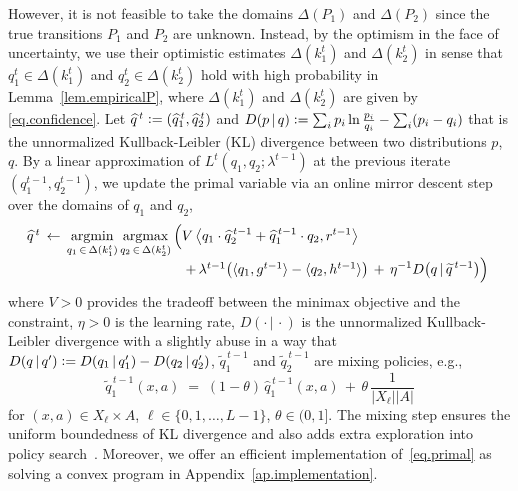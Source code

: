\documentclass[12pt, final]{l4dc2023}
\begin{document}
However, it is not feasible to take the domains $\Delta(P_1)$ and $\Delta(P_2)$ since the true transitions $P_1$ and $P_2$ are unknown. Instead, by the optimism in the face of uncertainty, we use their optimistic estimates $\Delta(k_1^t)$ and $\Delta(k_2^t)$ in sense that $q_1^t\in \Delta(k_1^t)$ and $q_2^t\in \Delta(k_2^t)$ hold with high probability in Lemma~\ref{lem.empiricalP}, where $\Delta(k_1^t)$ and $\Delta(k_2^t)$ are given by \eqref{eq.confidence}. Let $\widehat q^{\,t} \mathrel{\mathop:}= (\widehat q_1^{\,t},\widehat q_2^{\,t})$ and $D(p\,\vert\,q) \mathrel{\mathop:}= \sum_{i} p_i \ln\frac{p_i}{q_i} - \sum_{i} (p_i-q_i)$ that is the unnormalized Kullback-Leibler (KL) divergence between two distributions $p$, $q$.
By a linear approximation of $L^t(q_1,q_2;\lambda^{t-1})$ at the previous iterate $(q_1^{t-1},q_2^{t-1})$, we update the primal variable via an online mirror descent step over the domains of $q_1$ and $q_2$,
\begin{equation}\label{eq.primal}
\begin{array}{rcl}
&&  \!\!\!\! \!\!\!\! \!\!\!\! \!\!
\hat q^{\,t}
\,\leftarrow\,
\displaystyle \argmin_{q_1\,\in\,\Delta(k_1^t)} \argmax_{q_2\,\in\,\Delta(k_2^t)} 
\Big(
V\, 
\big\langle{q_1\cdot \hat q_2^{\,t-1}+\hat q_1^{\,t-1}\cdot q_2},{r^{t-1}}\big\rangle 
\\[0.2cm]
&& \;\;\;\;  \;\;\;\;  \;\;\;\;  \;\;\;\;  \;\;\;\;  \;\;\;\;  \;\;\;\;  \;\;\;\;
\,+\,
\lambda^{t-1} \big( \langle{q_1},{g^{t-1}}\rangle 
- \langle{q_2},{h^{t-1}}\rangle\big)
\, +\, 
\displaystyle \eta^{-1} D\big(q\,\vert\,  \tilde{q}^{\,t-1}\big)\Big)
\end{array}
\end{equation}
where $V>0$ provides the tradeoff between the minimax objective and the constraint, $\eta>0$ is the learning rate, $D(\cdot\,\vert\,\cdot)$ is the unnormalized Kullback-Leibler divergence with a slightly abuse in a way that $D(q\,\vert\,q') \mathrel{\mathop:}= D(q_1\,\vert\,q_1')-D(q_2\,\vert\,q_2')$, $\tilde{q}_1^{\,t-1}$ and $\tilde{q}_2^{\,t-1}$ are mixing policies, e.g., 
\begin{equation}\label{eq.mixing}
\tilde{q}_1^{\,t-1}(x,a) \;=\; (1-\theta) \,\hat {q}_1^{\,t-1}(x,a)\,+\,\theta\,\frac{1}{|X_\ell||A|}
\end{equation}
for $(x,a)\in X_\ell\times A$, $\ell\in\{ 0,1,\ldots,L-1\}$, $\theta\in (0,1]$. 
The mixing step ensures the uniform boundedness of KL divergence and also adds extra exploration into policy search~\citep{wei2020online}. Moreover, we offer an efficient implementation of~\eqref{eq.primal} as solving a convex program in Appendix~\ref{ap.implementation}.
\end{document}
